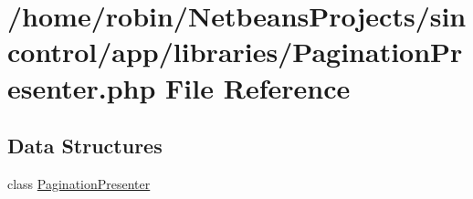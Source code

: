 \hypertarget{_pagination_presenter_8php}{}\section{/home/robin/\+Netbeans\+Projects/sincontrol/app/libraries/\+Pagination\+Presenter.php File Reference}
\label{_pagination_presenter_8php}
\subsection*{Data Structures}
\begin{DoxyCompactItemize}
\item 
class \hyperlink{class_pagination_presenter}{Pagination\+Presenter}
\end{DoxyCompactItemize}
